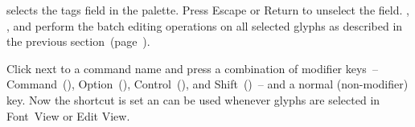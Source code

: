 \bigbreak\noindent%

\bigbreak\noindent{} selects the tags field in the palette.
Press Escape or Return to unselect the field.
, , and  perform the batch editing operations on all selected glyphs as described in the previous section~(page~\pageref{sec:batch_editing_tags}).

Click  next to a command name and press a combination of modifier keys~-- Command~(), Option~(), Control~(), and Shift~()~-- and a normal (non-modifier) key.
Now the shortcut is set an can be used whenever glyphs are selected in Font~View or Edit View.
